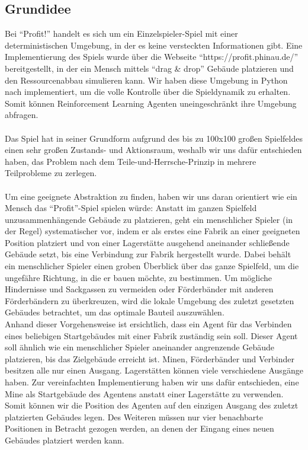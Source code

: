 \subsection{Grundidee}
Bei “Profit!” handelt es sich um ein Einzelspieler-Spiel mit einer deterministischen Umgebung, in der es keine versteckten Informationen gibt. Eine Implementierung des Spiels wurde über die Webseite “https://profit.phinau.de/” bereitgestellt, in der ein Mensch mittels “drag \& drop” Gebäude platzieren und den Ressourcenabbau simulieren kann. Wir haben diese Umgebung in Python nach implementiert, um die volle Kontrolle über die Spieldynamik zu erhalten. Somit können Reinforcement Learning Agenten uneingeschränkt ihre Umgebung abfragen.
\\\\
Das Spiel hat in seiner Grundform aufgrund des bis zu 100x100 großen Spielfeldes einen sehr großen Zustands- und Aktionsraum, weshalb wir uns dafür entschieden haben, das Problem nach dem Teile-und-Herrsche-Prinzip in mehrere Teilprobleme zu zerlegen.
\\\\
Um eine geeignete Abstraktion zu finden, haben wir uns daran orientiert wie ein Mensch das “Profit”-Spiel spielen würde: Anstatt im ganzen Spielfeld unzusammenhängende Gebäude zu platzieren, geht ein menschlicher Spieler (in der Regel) systematischer vor, indem er als erstes eine Fabrik an einer geeigneten Position platziert und von einer Lagerstätte ausgehend aneinander schließende Gebäude setzt, bis eine Verbindung zur Fabrik hergestellt wurde. Dabei behält ein menschlicher Spieler einen groben Überblick über das ganze Spielfeld, um die ungefähre Richtung, in die er bauen möchte, zu bestimmen. Um mögliche Hindernisse und Sackgassen zu vermeiden oder Förderbänder mit anderen Förderbändern zu überkreuzen, wird die lokale Umgebung des zuletzt gesetzten Gebäudes betrachtet, um das optimale Bauteil auszuwählen. 
\\
Anhand dieser Vorgehensweise ist ersichtlich, dass ein Agent für das Verbinden eines beliebigen Startgebäudes mit einer Fabrik zuständig sein soll. Dieser Agent soll ähnlich wie ein menschlicher Spieler aneinander angrenzende Gebäude platzieren, bis das Zielgebäude  erreicht ist. 
Minen, Förderbänder und Verbinder besitzen alle nur einen Ausgang. Lagerstätten können viele verschiedene Ausgänge haben. Zur vereinfachten Implementierung haben wir uns dafür entschieden, eine Mine als Startgebäude des Agentens anstatt einer Lagerstätte zu verwenden. Somit können wir die Position des Agenten auf den einzigen Ausgang des zuletzt platzierten Gebäudes legen. Des Weiteren müssen nur vier benachbarte Positionen in Betracht gezogen werden, an denen der Eingang eines neuen Gebäudes platziert werden kann. 
